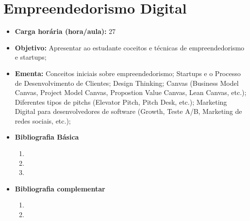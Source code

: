\documentclass[
	10pt,				%
	openright,			%
	twoside,			%
	a4paper,			%
	english,			%
	french,				%
	brazil,				%
	sumario=tradicional
]{abntex2}
\begin{document}
\section*{Empreendedorismo Digital}\label{6_empdig}
\begin{itemize}
	\item \textbf{Carga horária (hora/aula):} 27
	\item \textbf{Objetivo:} Apresentar ao estudante coceitos e técnicas de empreendedorismo e startups;
	\item \textbf{Ementa:} 
	Conceitos iniciais sobre empreendedorismo;
	Startups e o Processo de Desenvolvimento de Clientes;
	Design Thinking;
	Canvas (Business Model Canvas, Project Model Canvas, Propostion Value Canvas, Lean Canvas, etc.);
	Diferentes tipos de pitchs (Elevator Pitch, Pitch Desk, etc.);
	Marketing Digital para desenvolvedores de software (Growth, Teste A/B, Marketing de redes sociais, etc.);
	
	\item \textbf{Bibliografia Básica}
	\begin{enumerate}
		\item 
		\item 
		\item 
	\end{enumerate}
	\item \textbf{Bibliografia complementar}
	\begin{enumerate}
		\item 
		\item
	\end{enumerate} 	
\end{itemize}


\newpage
\end{document}
